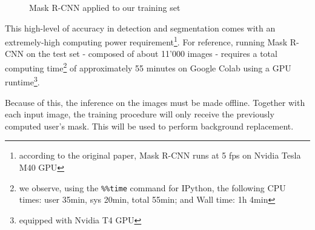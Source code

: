 \begin{figure}[!h]
\begin{center}
\begin{subfigure}[h]{0.32\textwidth}
		\end{subfigure}
	\end{center}
	\vspace{-0.5cm}
	\caption[Mask R-CNN applied to our training set]{Mask R-CNN applied to our training set}
	\label{fig:maskrcnn-dario}
\end{figure}

This high-level of accuracy in detection and segmentation comes with an extremely-high computing power requirement\footnote{according to the original paper, Mask R-CNN runs at 5 \gls{fps} on Nvidia Tesla M40 GPU}. For reference, running Mask R-CNN on the test set - composed of about 11'000 images - requires a total computing time\footnote{we observe, using the \texttt{\%\%time} command for IPython, the following CPU times: user 35min, sys 20min, total 55min; and Wall time: 1h 4min} of approximately 55 minutes on Google Colab using a GPU runtime\footnote{equipped with Nvidia T4 GPU}.

Because of this, the inference on the images must be made offline. Together with each input image, the training procedure will only receive the previously computed user's mask. This will be used to perform background replacement.

